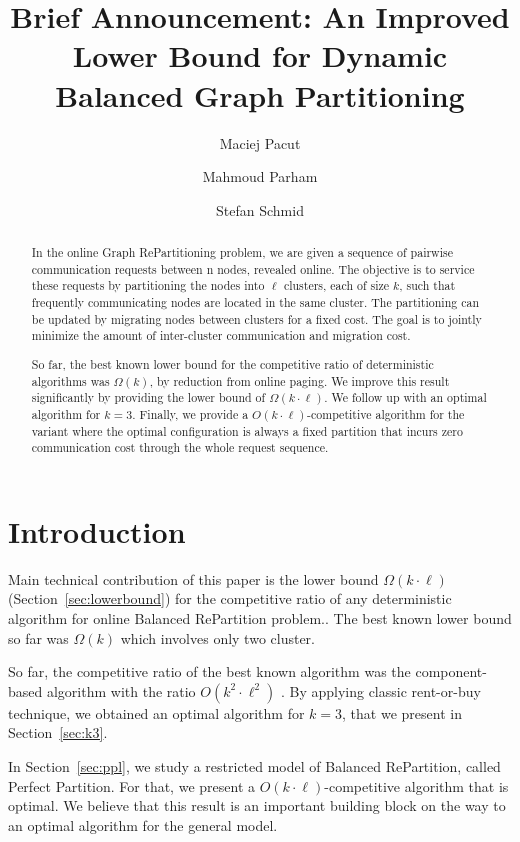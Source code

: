 \documentclass[manuscript,screen=true]{acmart}
\title{Brief Announcement: An Improved Lower Bound for Dynamic Balanced Graph Partitioning}
\author{Maciej Pacut}
\affiliation{%
  \institution{Faculty of Computer Science, University of Vienna}
  \country{Austria}
}
\author{Mahmoud Parham}
\affiliation{%
  \institution{Faculty of Computer Science, University of Vienna}
  \country{Austria}
}
\author{Stefan Schmid}
\affiliation{%
  \institution{Faculty of Computer Science, University of Vienna}
  \country{Austria}
}
\begin{document}
\begin{abstract}
  In the online Graph RePartitioning problem, we are given a sequence of pairwise communication requests between n nodes, revealed online.
  The objective is to service these requests by partitioning the nodes into $\ell$ clusters, each of size $k$, such that frequently communicating nodes are located in the same cluster.
  The partitioning can be updated by migrating nodes between clusters for a fixed cost.
  The goal is to jointly minimize the amount of inter-cluster communication and migration cost.


  So far, the best known lower bound for the competitive ratio of
	deterministic algorithms was $\Omega(k)$,
 by reduction from online paging.
  We improve this result significantly by providing the lower bound of $\Omega(k\cdot \ell)$.
  We follow up with an optimal algorithm for $k=3$.
  Finally,
  we provide a $O(k\cdot \ell)$-competitive algorithm for the variant
  where the optimal configuration is always a fixed partition
  that incurs zero communication cost through the whole request sequence.
\end{abstract}
    
\maketitle
    
\renewcommand{\shortauthors}{M.~Pacut, M.~Parham, S.~Schmid}

\section{Introduction}

Main technical contribution of this paper is the lower bound $\Omega(k\cdot\ell)$ (Section~\ref{sec:lowerbound}) for the competitive ratio of any deterministic algorithm for online Balanced RePartition problem..
The best known lower bound so far was $\Omega(k)$ \cite{repartition-disc}
which involves only two cluster.


So far, the competitive ratio of the best known algorithm was the component-based algorithm with the ratio $O(k^2\cdot \ell^2)$ \cite{repartition-disc}.
By applying classic rent-or-buy technique, we obtained an optimal algorithm for $k=3$, that we present in Section~\ref{sec:k3}.

In Section~\ref{sec:ppl}, we study a restricted model of Balanced RePartition, called Perfect Partition.
For that, we present a $O(k\cdot \ell)$-competitive algorithm that is optimal.
We believe that this result is an important building block on the way to an optimal algorithm for the general model.
\end{document}
